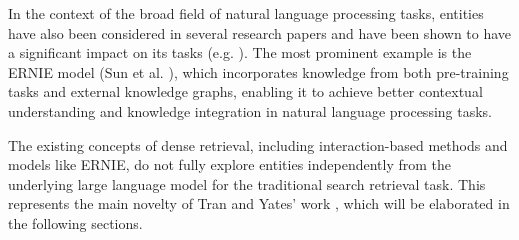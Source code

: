In the context of the broad field of natural language processing tasks, entities have also been considered in several research papers and have been shown to have a significant impact on its tasks (e.g. ). The most prominent example is the ERNIE model (Sun et al. \cite{ernie}), which incorporates knowledge from both pre-training tasks and external knowledge graphs, enabling it to achieve better contextual understanding and knowledge integration in natural language processing tasks. 

\begin{comment}
    ERNIE builds upon BERT's methods, particularly the masked language model, and tailors them to a more context-sensitive learning approach. ERNIE employs a masking strategy during its learning procedure, where the model is required to predict not only single words or tokens, but also several consecutive words. These consecutive words originate from different subtasks within the ERNIE model, including basic-level masking, phrase-level masking, and entity-level masking. The basic-level masking follows the standard token masking approach used in BERT, while the phrase-level masking groups small sets of tokens together to form conceptual units in the language to learn. Of most relevance to this seminar report is the entity-level masking stage, where the model tries to accurately predict entities that can span multiple tokens. This leads to the model becoming highly sensitive towards entities, as demonstrated by Sun et al. in their work on ERNIE \cite{ernie}. ERNIE can be fine-tuned for information retrieval tasks, offering valuable insights and serving as a reference model for Tran and Yates' work \cite{tran2022dense}.
\end{comment}

The existing concepts of dense retrieval, including interaction-based methods and models like ERNIE, do not fully explore entities independently from the underlying large language model for the traditional search retrieval task. This represents the main novelty of Tran and Yates' work \cite{tran2022dense}, which will be elaborated in the following sections.



